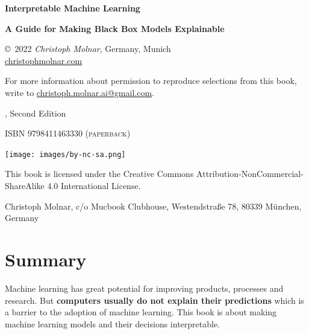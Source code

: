 \documentclass[
  10pt,
]{scrbook}
\begin{document}
\thispagestyle{empty}
\begin{center}
  {
  \bfseries \sffamily \LARGE Interpretable Machine Learning\par
  \bfseries \small A Guide for Making Black Box Models Explainable\par
}

\copyright~2022 \textit{Christoph Molnar}, Germany, Munich\\
\url{christophmolnar.com}

For more information about permission to reproduce selections from this book, write to \url{christoph.molnar.ai@gmail.com}.

	\the\year, Second Edition

\ifxetex
	\textsc{ISBN 9798411463330 (paperback)} 
\fi

\texttt{[image: images/by-nc-sa.png]}

This book is licensed under the Creative Commons Attribution-NonCommercial-ShareAlike 4.0 International License.
  
  Christoph Molnar,
  c/o Mucbook Clubhouse,
  Westendstraße 78,
  80339 München, Germany

\end{center}

\newpage
\thispagestyle{empty}
\mbox{}
\newpage

{
\hypersetup{linkcolor=}
\setcounter{tocdepth}{1}
\tableofcontents
}
\hypertarget{summary}{%
\chapter*{Summary}\label{summary}}


Machine learning has great potential for improving products, processes and research.
But \textbf{computers usually do not explain their predictions} which is a barrier to the adoption of machine learning.
This book is about making machine learning models and their decisions interpretable.
\end{document}
